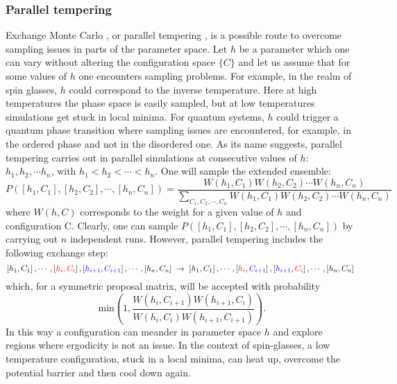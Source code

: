 \subsubsection{Parallel tempering } 
\label{Parallel_tempering.sec}
% 
Exchange Monte Carlo \cite{Hukushima96}, or parallel tempering \cite{Greyer91}, is a possible route to overcome sampling issues in parts of the parameter space.
Let $h$ be a parameter which one can vary without  altering the configuration space $ \{C  \}  $ and let us assume that for some values of $h$ one encounters sampling problems.   For example, in the realm of spin glasses, $h$  could correspond to the  inverse temperature.  Here at high temperatures the phase space is easily sampled, but at low temperatures  simulations get stuck in local minima. For quantum systems, $h$ could   trigger a quantum phase transition where  sampling issues are encountered, for example, in the ordered phase and not in the disordered one.   As its name suggests, parallel tempering  carries out in parallel simulations at consecutive  values of  $h$:  $h_1, h_2,  \cdots h_n$, with  $h_{1} < h_2 < \cdots < h_n$.  One will sample the extended ensemble:
\begin{equation}
	P(\left[h_1,C_1\right], \left[h_2,C_2\right], \cdots, \left[h_n,C_n\right] ) =  \frac{W(h_1,C_1) W(h_2,C_2) \cdots   W(h_n,C_n) } {\sum_{C_1, C_2, \cdots, C_n} W( h_1,C_1) W( h_2,C_2) \cdots   W(h_n,C_n)}
\end{equation}
where $W(h,C)$ corresponds to the weight for a given value of $h$ and configuration C. 
Clearly, one can sample  $P( \left[h_1,C_1\right], \left[h_2,C_2\right], \cdots, \left[h_n,C_n\right])$ by carrying out $n$ independent runs.
However, parallel tempering  includes the following   exchange step:
\begin{equation} \label{eq:exchangestep}
	\left[h_1,C_1\right], \cdots, \left[\textcolor{red}{h_i,C_i}\right],\left[\textcolor{blue}{h_{i+1},C_{i+1}}\right], \cdots, \left[h_n,C_n\right]  \; \rightarrow \;
	\left[h_1,C_1\right], \cdots, \left[\textcolor{red}{h_i},\textcolor{blue}{C_{i+1}}\right],\left[\textcolor{blue}{h_{i+1}},\textcolor{red}{C_{i}}\right], \cdots, \left[h_n,C_n\right] 
\end{equation}
which, for a symmetric proposal matrix, will  be accepted with probability
\begin{equation}
	\text{ min} \left( 1,   \frac{ W(h_i,C_{i+1}) W(h_{i+1},C_{i})}{W(h_i,C_{i}) W(h_{i+1},C_{i+1})} \right).
\end{equation}
In this way a configuration can meander in parameter space $h$ and  explore regions where ergodicity is not an issue. In the context of spin-glasses, a low temperature configuration, stuck in a local minima, can heat up, overcome the potential  barrier and then cool down again. 
 

